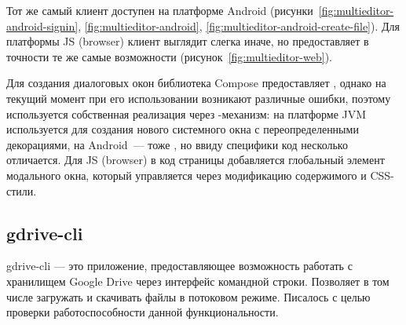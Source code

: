     
    Тот же самый клиент доступен на платформе Android  (рисунки~\ref{fig:multieditor-android-signin}, \ref{fig:multieditor-android}, \ref{fig:multieditor-android-create-file}). Для платформы JS (browser) клиент выглядит слегка иначе, но предоставляет в точности те же самые возможности (рисунок~\ref{fig:multieditor-web}).


    Для создания диалоговых окон библиотека Compose предоставляет , однако на текущий момент при его использовании возникают различные ошибки\cite{gh-compose-alert-dialog,gh-compose-alert-dialog-2}, поэтому используется собственная реализация  через -механизм: на платформе JVM используется  для создания нового системного окна с переопределенными декорациями, на Android~--- тоже , но ввиду специфики код несколько отличается. Для JS (browser) в код страницы добавляется глобальный элемент модального окна, который управляется через модификацию содержимого и CSS-стили.


\subsection{gdrive-cli}
  gdrive-cli\cite{gh-gdrive-cli} --- это приложение, предоставляющее возможность работать с хранилищем Google Drive через интерфейс командной строки. Позволяет в том числе загружать и скачивать файлы в потоковом режиме. Писалось с целью проверки работоспособности данной функциональности.

